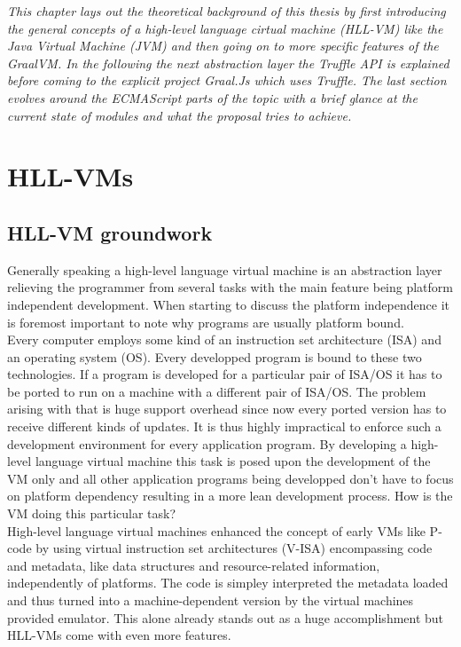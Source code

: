 \emph{This chapter lays out the theoretical background of this thesis by first introducing the general concepts of a high-level language cirtual machine (HLL-VM) like the Java Virtual Machine (JVM) and then going on to more specific features of the GraalVM. In the following the next abstraction layer the Truffle API is explained before coming to the explicit project Graal.Js which uses Truffle. The last section evolves around the ECMAScript parts of the topic with a brief glance at the current state of modules and what the proposal tries to achieve.}

\section{HLL-VMs}
\subsection{HLL-VM groundwork}
Generally speaking a high-level language virtual machine is an abstraction layer relieving the programmer from several tasks with the main feature being platform independent development. When starting to discuss the platform independence it is foremost important to note why programs are usually platform bound.\\
Every computer employs some kind of an instruction set architecture (ISA) and an operating system (OS). Every developped program is bound to these two technologies. If a program is developed for a particular pair of ISA/OS it has to be ported to run on a machine with a different pair of ISA/OS. The problem arising with that is huge support overhead since now every ported version has to receive different kinds of updates. It is thus highly impractical to enforce such a development environment for every application program. By developing a high-level language virtual machine this task is posed upon the development of the VM only and all other application programs being developped don't have to focus on platform dependency resulting in a more lean development process. How is the VM doing this particular task?\\
High-level language virtual machines enhanced the concept of early VMs like P-code by using virtual instruction set architectures (V-ISA) encompassing code and metadata, like data structures and resource-related information, independently of platforms. The code is simpley interpreted the metadata loaded and thus turned into a machine-dependent version by the virtual machines provided emulator. This alone already stands out as a huge accomplishment but HLL-VMs come with even more features.\\
